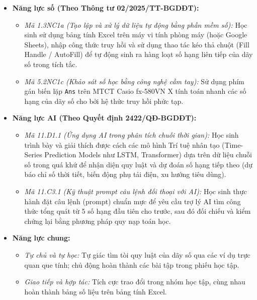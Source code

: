 \documentclass[12pt, a4paper]{article}
\begin{document}
\begin{itemize}[leftmargin=1.2cm]
    \item \textbf{Năng lực số (Theo Thông tư 02/2025/TT-BGDĐT):}  
    \begin{itemize}[leftmargin=0.6cm]  
        \item \textit{Mã 1.3NC1a (Tạo lập và xử lý dữ liệu tự động bằng phần mềm số):} Học sinh sử dụng bảng tính Excel trên máy vi tính phòng máy (hoặc Google Sheets), nhập công thức truy hồi và sử dụng thao tác kéo thả chuột (Fill Handle / AutoFill) để tự động sinh ra hàng loạt số hạng liên tiếp của dãy số trong tích tắc.  
        \item \textit{Mã 5.2NC1c (Khảo sát số học bằng công nghệ cầm tay):} Sử dụng phím gán biến lặp \texttt{Ans} trên MTCT Casio fx-580VN X tính toán nhanh các số hạng của dãy số cho bởi hệ thức truy hồi phức tạp.  
    \end{itemize}  
  
    \item \textbf{Năng lực AI (Theo Quyết định 2422/QĐ-BGDĐT):}  
    \begin{itemize}[leftmargin=0.6cm]  
        \item \textit{Mã 11.D1.1 (Ứng dụng AI trong phân tích chuỗi thời gian):} Học sinh trình bày và giải thích được cách các mô hình Trí tuệ nhân tạo (Time-Series Prediction Models như LSTM, Transformer) dựa trên dữ liệu chuỗi số trong quá khứ để nhận diện quy luật và dự đoán số hạng tiếp theo (dự báo chỉ số thời tiết, biến động phụ tải điện, xu hướng tiêu dùng).  
        \item \textit{Mã 11.C3.1 (Kỹ thuật prompt câu lệnh đối thoại với AI):} Học sinh thực hành đặt câu lệnh (prompt) chuẩn mực để yêu cầu trợ lý AI tìm công thức tổng quát từ 5 số hạng đầu tiên cho trước, sau đó đối chiếu và kiểm chứng lại bằng phương pháp quy nạp toán học.  
    \end{itemize}  
  
    \item \textbf{Năng lực chung:}  
    \begin{itemize}[leftmargin=0.6cm]  
        \item \textit{Tự chủ và tự học:} Tự giác tìm tòi quy luật của dãy số qua các ví dụ trực quan que tính; chủ động hoàn thành các bài tập trong phiếu học tập.  
        \item \textit{Giao tiếp và hợp tác:} Tích cực trao đổi trong nhóm học tập, cùng nhau hoàn thành bảng số liệu trên bảng tính Excel.  
    \end{itemize}  
\end{itemize}  
  
\end{document}
